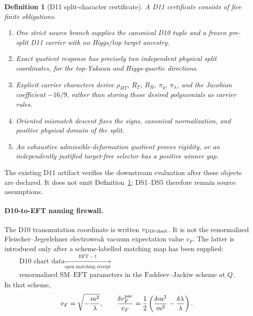 \documentclass[11pt]{article}
\newtheorem{definition}[theorem]{Definition}
\begin{document}
\begin{definition}[D11 split-character certificate]\label{def:d11-split-certificate}
A D11 certificate consists of five finite obligations.
\begin{enumerate}[leftmargin=2em,label=\textup{DS\arabic*.}]
\item One strict source branch supplies the canonical D10 tuple and a frozen
pre-split D11 carrier with no Higgs/top target ancestry.
\item Exact quotient response has precisely two independent physical split
coordinates, for the top-Yukawa and Higgs-quartic directions.
\item Explicit carrier characters derive \(\rho_{HT}\), \(R_T\), \(R_H\),
\(\pi_y\), \(\pi_\lambda\), and the Jacobian coefficient \(-16/9\), rather
than storing those desired polynomials as carrier rules.
\item Oriented mismatch descent fixes the signs, canonical normalization, and
positive physical domain of the split.
\item An exhaustive admissible-deformation quotient proves rigidity, or an
independently justified target-free selector has a positive winner gap.
\end{enumerate}
\end{definition}

The existing D11 artifact verifies the downstream evaluation after these
objects are declared.  It does not emit Definition~\ref{def:d11-split-certificate};
DS1--DS5 therefore remain source assumptions.

\paragraph{D10-to-EFT naming firewall.}
The D10 transmutation coordinate is written \(v_{\rm D10\,chart}\). It is not
the renormalized Fleischer--Jegerlehner electroweak vacuum expectation value
\(v_F\). The latter is introduced only after a scheme-labelled matching map
has been supplied:
\[
\boxed{\begin{gathered}
\text{D10 chart data}
\xrightarrow[\text{open matching receipt}]{\mathrm{EFT\!-1}}\\
\text{renormalized SM--EFT parameters in the Faddeev--Jackiw scheme at }Q.
\end{gathered}}
\]
In that scheme,
\[
v_F=\sqrt{-\frac{m^2}{\lambda}},\qquad
\frac{\delta v_F^{\rm par}}{v_F}
=\frac12\left(\frac{\delta m^2}{m^2}
-\frac{\delta\lambda}{\lambda}\right).
\]
\end{document}
